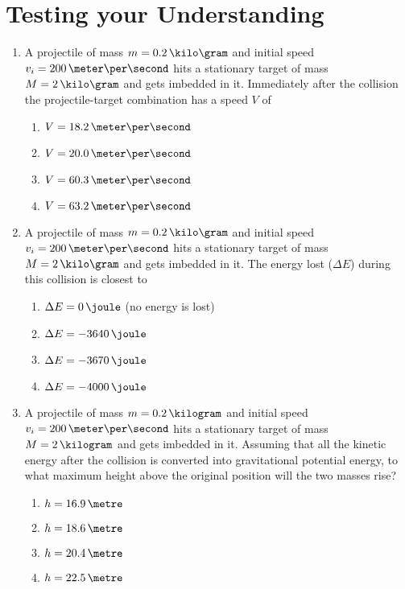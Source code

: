 
\section{Testing your Understanding}

\begin{enumerate}
\item A projectile of mass $m = 0.2\,\kilo\gram$ and initial speed $v_i = 200\,\meter\per\second$ hits a stationary target of mass $M = 2\,\kilo\gram$ and gets imbedded in it. Immediately after the collision the projectile-target combination has a speed $V$ of
  \begin{enumerate}
  \item $V = 18.2\,\meter\per\second$
  \item $V = 20.0\,\meter\per\second$
  \item $V = 60.3\,\meter\per\second$
  \item $V = 63.2\,\meter\per\second$
  \end{enumerate}
\item A projectile of mass $m = 0.2\,\kilo\gram$ and initial speed $v_i =200\,\meter\per\second$ hits a stationary target of mass $M = 2\,\kilo\gram$ and gets imbedded in it. The energy lost ($\Delta E$) during this collision is closest to
  \begin{enumerate}
  \item $\Delta E =     0\,\joule$ (no energy is lost)
  \item $\Delta E = -3640\,\joule$
  \item $\Delta E = -3670\,\joule$
  \item $\Delta E = -4000\,\joule$
  \end{enumerate}
\item A projectile of mass $m = 0.2\,\kilogram$ and initial speed $v_i = 200\,\meter\per\second$ hits a stationary target of mass $M = 2\,\kilogram$ and gets imbedded in it. Assuming that all the kinetic energy after the collision is converted into gravitational potential energy, to what maximum height above the original position will the two masses rise?
  \begin{enumerate}
  \item $h = 16.9\,\metre$
  \item $h = 18.6\,\metre$
  \item $h = 20.4\,\metre$
  \item $h = 22.5\,\metre$
  \end{enumerate}

\end{enumerate}

